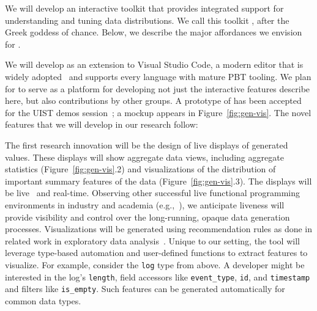  { %
 We will develop an interactive toolkit that provides integrated
 support for understanding and tuning data distributions.
We call this toolkit \tyche{}, after the Greek goddess of
chance. Below, we describe the major affordances we envision
for \tyche{}.

We will develop \tyche{}
as an extension to Visual Studio Code, a modern editor that is widely
adopted~\cite{noauthor_stack_nodate} and supports every language
with mature PBT tooling. We plan for \tyche{} to serve as a platform
for developing not just the interactive features describe here, but
also contributions
by other groups. A prototype of \tyche{} has been
accepted for the UIST demos session~\cite{ref:goldstein2023tyche}; a
mockup appears in Figure~\ref{fig:gen-vis}. The novel features that we
will develop in our research follow:

The first research innovation will be the design of live displays of generated
values. These displays
will show aggregate data views, including aggregate
statistics (Figure~\ref{fig:gen-vis}.2) and visualizations of the distribution
of important summary features of the data (Figure~\ref{fig:gen-vis}.3). The
displays will be live~\cite{ref:tanimoto1990viva} and
real-time. Observing other successful live functional programming
environments in industry and academia
(e.g.,~\cite{tool:lighttable,ref:omar2019live}), we anticipate liveness will
provide visibility and control over the
long-running, opaque data generation processes.  Visualizations will be
generated using recommendation rules as done in related work in exploratory data
analysis~\cite{ref:lee2021lux,wongsuphasawat_voyager_2016,
wongsuphasawat_voyager_2017}. Unique to our setting, the tool will leverage
type-based automation and user-defined functions to extract features to
visualize.
For example, consider the
\lstinline{log} type
from above. A developer might be interested in the log's
\lstinline{length}, field accessors like \lstinline{event_type}, \lstinline{id},
and \lstinline{timestamp} and filters like \lstinline{is_empty}. Such features can be
generated automatically for common data types.

}
